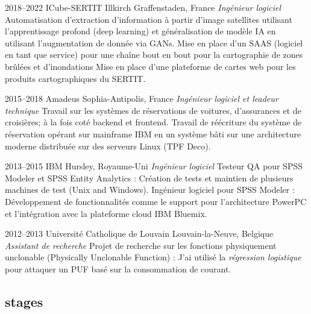\documentclass[]{friggeri-cv} %
\begin{document}
\begin{entrylist}



\entry
{2018--2022}
{ICube-SERTIT}
{Illkirch Graffenstaden, France}
{\emph{Ingénieur logiciel}
\medbreak
Automatisation d'extraction d'information à partir d'image satellites utilisant
    l'apprentissage profond (deep learning) et généralisation de modèle IA en
    utilisant l'augmentation de donnée via GANs.
\smallbreak
    Mise en place d'un SAAS (logiciel en tant que service) pour une chaîne
    bout en bout pour la cartographie de zones brûlées et d'inondations
\smallbreak
Mise en place d'une plateforme de cartes web pour les produits cartographiques
du SERTIT.
}

\entry
{2015--2018}
{Amadeus}
{Sophia-Antipolis, France}
{\emph{Ingénieur logiciel et leadeur technique}
\medbreak
Travail sur les systèmes de réservations de voitures, d'assurances et de 
croisières; à la fois coté backend et frontend.
\smallbreak
Travail de réécriture du système de
    réservation opérant sur mainframe IBM en un système bâti sur une
    architecture moderne distribuée sur des serveurs Linux (TPF Deco).
\bigbreak %
}

\entry
{2013--2015}
{IBM}
{Hursley, Royaume-Uni}
{\emph{Ingénieur logiciel}
\medbreak
Testeur QA pour SPSS Modeler et SPSS Entity Analytics : Création de
    tests et maintien de plusieurs machines de test (Unix and Windows).
\smallbreak
Ingénieur logiciel pour SPSS Modeler : Développement de fonctionnalités comme le
    support pour l'architecture PowerPC et l’intégration avec la plateforme cloud IBM Bluemix.
\bigbreak %
}

\entry
{2012--2013}
{Université Catholique de Louvain}
{Louvain-la-Neuve, Belgique}
{\emph{Assistant de recherche}
\medbreak
Projet de recherche sur les fonctions physiquement
unclonable
(Physically Unclonable Function) :  J’ai utilisé la
\emph{régression logistique} pour attaquer un PUF basé sur la consommation de courant.
}

\end{entrylist}

\newpage

\subsection{stages}
\end{document}
